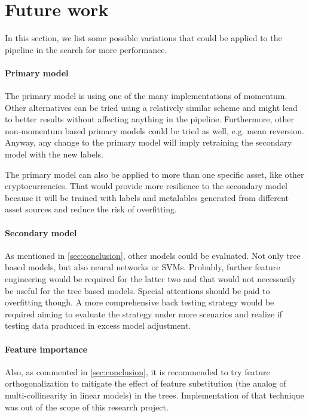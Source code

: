 \section{Future work}
\label{sec:future_work}

In this section, we list some possible variations that could be applied to the
pipeline in the search for more performance.

\paragraph{Primary model} The primary model is using one of the many implementations
of momentum. Other alternatives can be tried using a relatively similar 
scheme and might lead to better results without affecting anything in the pipeline.
Furthermore, other non-momentum based primary models could be tried as well, e.g. mean reversion.
Anyway, any change to the primary model will imply retraining the secondary model
with the new labels.

The primary model can also be applied to more than one specific asset, like other
cryptocurrencies. That would provide more resilience to the secondary model because
it will be trained with labels and metalables generated from different asset sources
and reduce the risk of overfitting.

\paragraph{Secondary model} As mentioned in \ref{sec:conclusion}, other models
could be evaluated. Not only tree based models, but also neural networks or
SVMs. Probably, further feature engineering would be required for the latter two
and that would not necessarily be useful for the tree based models. Special
attentions should be paid to overfitting though. A more comprehensive back
testing strategy would be required aiming to evaluate the strategy under
more scenarios and realize if testing data produced in excess model adjustment.

\paragraph{Feature importance} Also, as commented in \ref{sec:conclusion}, 
it is recommended to try feature orthogonalization to mitigate the effect of
feature substitution (the analog of multi-collinearity in linear models) in the 
trees. Implementation of that technique was out of the scope of this research
project.


